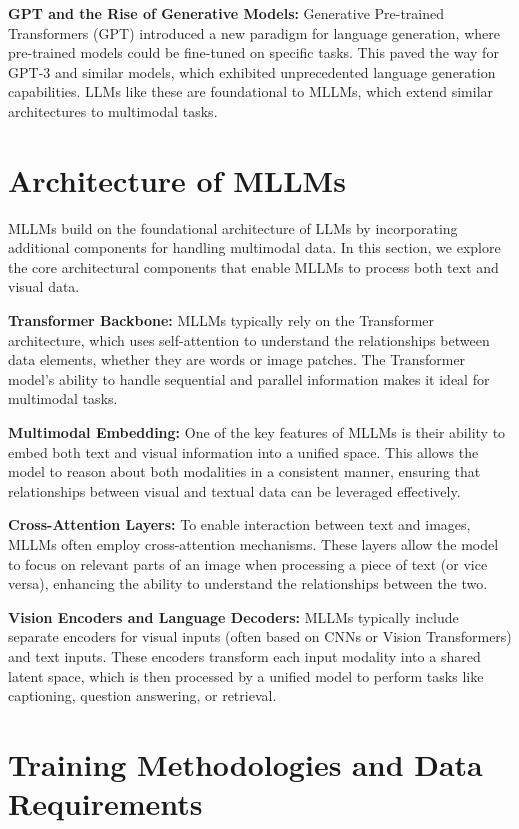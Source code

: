 \textbf{GPT and the Rise of Generative Models:} Generative Pre-trained Transformers (GPT) introduced a new paradigm for language generation, where pre-trained models could be fine-tuned on specific tasks. This paved the way for GPT-3 and similar models, which exhibited unprecedented language generation capabilities. LLMs like these are foundational to MLLMs, which extend similar architectures to multimodal tasks.

\section{Architecture of MLLMs}

MLLMs build on the foundational architecture of LLMs by incorporating additional components for handling multimodal data. In this section, we explore the core architectural components that enable MLLMs to process both text and visual data.

\textbf{Transformer Backbone:} MLLMs typically rely on the Transformer architecture, which uses self-attention to understand the relationships between data elements, whether they are words or image patches. The Transformer model’s ability to handle sequential and parallel information makes it ideal for multimodal tasks.

\textbf{Multimodal Embedding:} One of the key features of MLLMs is their ability to embed both text and visual information into a unified space. This allows the model to reason about both modalities in a consistent manner, ensuring that relationships between visual and textual data can be leveraged effectively.

\textbf{Cross-Attention Layers:} To enable interaction between text and images, MLLMs often employ cross-attention mechanisms. These layers allow the model to focus on relevant parts of an image when processing a piece of text (or vice versa), enhancing the ability to understand the relationships between the two.

\textbf{Vision Encoders and Language Decoders:} MLLMs typically include separate encoders for visual inputs (often based on CNNs or Vision Transformers) and text inputs. These encoders transform each input modality into a shared latent space, which is then processed by a unified model to perform tasks like captioning, question answering, or retrieval.

\section{Training Methodologies and Data Requirements}

